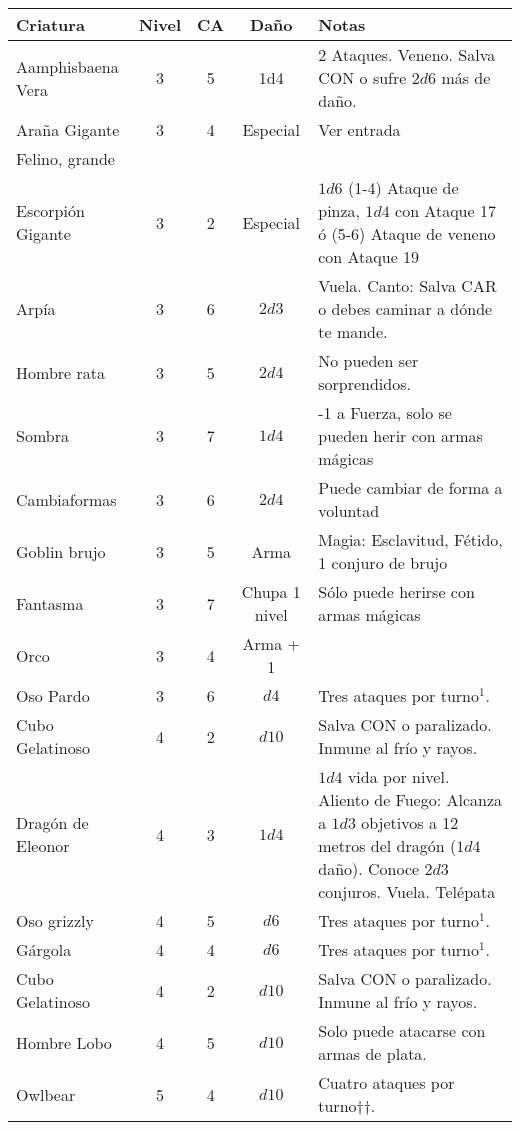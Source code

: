 \begin{table*}[p]
\label{c:2nivel}
\centering
\begin{threeparttable}
\begin{tabular}{lcccp{8cm}}
\toprule
Criatura             & Nivel & CA & Daño & Notas\\
\midrule
Aamphisbaena Vera    & 3 & 5 & 1d4 & 2 Ataques. Veneno. Salva CON o sufre $2d6$ más de daño.\\
Araña Gigante        & 3 & 4 & Especial & Ver entrada\\
Felino, grande \\
Escorpión Gigante    & 3 & 2 & Especial & $1d6$ (1-4) Ataque de pinza, $1d4$ con Ataque 17 ó (5-6) Ataque de veneno con Ataque 19\\
Arpía                & 3 & 6 & $2d3$ & Vuela. Canto: Salva CAR o debes caminar a dónde te mande.\\
Hombre rata          & 3 & 5 & $2d4$ & No pueden ser sorprendidos. \\
Sombra               & 3 & 7 & $1d4$ & -1 a Fuerza, solo se pueden herir con armas mágicas\\
Cambiaformas         & 3 & 6 & $2d4$ & Puede cambiar de forma a voluntad\\
Goblin brujo         & 3 & 5 & Arma & Magia: Esclavitud, Fétido, 1 conjuro de brujo\\
Fantasma             & 3 & 7 & Chupa 1 nivel & Sólo puede herirse con armas mágicas\\
Orco                 & 3 & 4 & Arma + 1 & \\
Oso Pardo            & 3 & 6 & $d4$ & Tres ataques por turno$^1$.\\
\midrule
Cubo Gelatinoso      & 4 & 2 & $d10$ & Salva CON o paralizado. Inmune al frío y rayos.\\
Dragón de Eleonor    & 4 & 3 & $1d4$ & $1d4$ vida por nivel. Aliento de Fuego: Alcanza a $1d3$ objetivos a 12 metros del dragón ($1d4$ daño). Conoce $2d3$ conjuros. Vuela. Telépata\\
Oso grizzly          & 4 & 5 & $d6$ & Tres ataques por turno$^1$.\\
Gárgola              & 4 & 4 & $d6$ & Tres ataques por turno$^1$.\\
Cubo Gelatinoso      & 4 & 2 & $d10$ & Salva CON o paralizado. Inmune al frío y rayos.\\
Hombre Lobo          & 4 & 5 & $d10$ & Solo puede atacarse con armas de plata.\\
\midrule
Owlbear              & 5 & 4 &$  d10$ & Cuatro ataques por turno††.\\

\end{tabular}
\end{threeparttable}
\end{table*}
